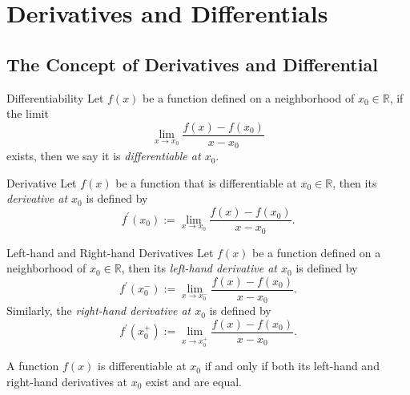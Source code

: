 
\section{Derivatives and Differentials}

\subsection{The Concept of Derivatives and Differential}

\begin{definition}{Differentiability}{}
  Let $f(x)$ be a function defined on a neighborhood of $x_0 \in \mathbb{R}$,
  if the limit
  \begin{equation}
     \lim \limits _{x \rightarrow x_0} \frac{f(x) - f(x_0)}{x - x_0}
  \end{equation}
  exists, then we say it is \emph{differentiable at $x_0$}.
\end{definition}

\begin{definition}{Derivative}{}
  Let $f(x)$ be a function that is differentiable at $x_0 \in \mathbb{R}$,
  then its \emph{derivative at $x_0$} is defined by
  \begin{equation}
    f^{\prime}(x_0) := \lim \limits _{x \rightarrow x_0} \frac{f(x) - f(x_0)}{x - x_0}.
  \end{equation}
\end{definition}

\begin{definition}{Left-hand and Right-hand Derivatives}{}
  Let $f(x)$ be a function defined on a neighborhood of $x_0 \in \mathbb{R}$,
  then its \emph{left-hand derivative at $x_0$} is defined by
  \begin{equation}
    f^{\prime}(x_0^-) := \lim \limits _{x \rightarrow x_0^-} \frac{f(x) - f(x_0)}{x - x_0}.
  \end{equation}
  Similarly, the \emph{right-hand derivative at $x_0$} is defined by
  \begin{equation}
    f^{\prime}(x_0^+) := \lim \limits _{x \rightarrow x_0^+} \frac{f(x) - f(x_0)}{x - x_0}.
  \end{equation}
\end{definition}

\begin{note}
  A function $f(x)$ is differentiable at $x_0$ if and only if both its left-hand and right-hand
  derivatives at $x_0$ exist and are equal.
\end{note}

